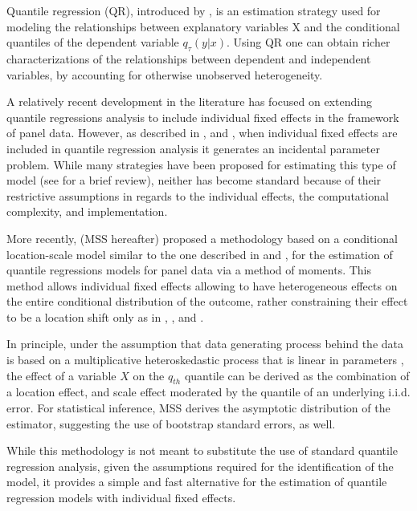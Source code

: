 \documentclass[
  authoryear,
  review,
  1p]{elsarticle}
\begin{document}
Quantile regression (QR), introduced by \citet{koenkerbasset1978}, is an
estimation strategy used for modeling the relationships between
explanatory variables X and the conditional quantiles of the dependent
variable \(q_\tau (y|x)\). Using QR one can obtain richer
characterizations of the relationships between dependent and independent
variables, by accounting for otherwise unobserved heterogeneity.

A relatively recent development in the literature has focused on
extending quantile regressions analysis to include individual fixed
effects in the framework of panel data. However, as described in
\citet{neymanscott1948}, and \citet{lancaster2000}, when individual
fixed effects are included in quantile regression analysis it generates
an incidental parameter problem. While many strategies have been
proposed for estimating this type of model (see
\citet{galvao2017quantile} for a brief review), neither has become
standard because of their restrictive assumptions in regards to the
individual effects, the computational complexity, and implementation.

More recently, \citet{mss2019} (MSS hereafter) proposed a methodology
based on a conditional location-scale model similar to the one described
in \citet{he1997} and \citet{zhao2000}, for the estimation of quantile
regressions models for panel data via a method of moments. This method
allows individual fixed effects allowing to have heterogeneous effects
on the entire conditional distribution of the outcome, rather
constraining their effect to be a location shift only as in
\citet{canay2011}, \citet{koenker2004}, and \citet{lancaster2000}.

In principle, under the assumption that data generating process behind
the data is based on a multiplicative heteroskedastic process that is
linear in parameters \citep[\citet{mss2019}, \citet{he1997},
\citet{zhao2000}]{cameron2005}, the effect of a variable \(X\) on the
\(q_{th}\) quantile can be derived as the combination of a location
effect, and scale effect moderated by the quantile of an underlying
i.i.d. error. For statistical inference, MSS derives the asymptotic
distribution of the estimator, suggesting the use of bootstrap standard
errors, as well.

While this methodology is not meant to substitute the use of standard
quantile regression analysis, given the assumptions required for the
identification of the model, it provides a simple and fast alternative
for the estimation of quantile regression models with individual fixed
effects.
\end{document}

